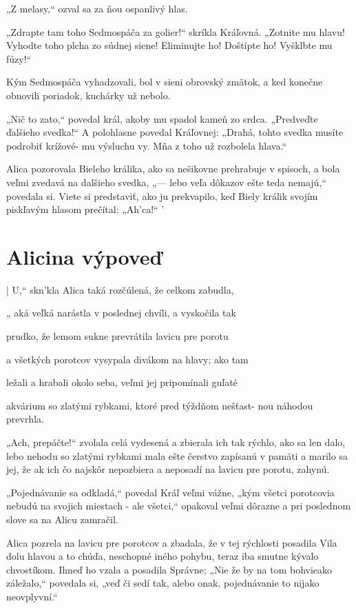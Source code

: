 \documentclass[12pt]{book}
\begin{document}
\begin{Parallel}[p]{}{}
{„Z melasy,“ ozval sa za ňou ospanlivý hlas.

„Zdrapte tam toho Sedmospáča za golier!“ skríkla
Kráľovná. „Zotnite mu hlavu! Vyhodte toho plcha zo
súdnej siene! Eliminujte ho! Doštípte ho! Vyšklbte mu
fúzy!“

Kým Sedmospáča vyhadzovali, bol v sieni obrovský
zmätok, a ked konečne obnovili poriadok, kuchárky už
nebolo.

„Nič to zato,“ povedal král, akoby mu spadol kameň zo
srdca. „Predveďte ďalšieho svedka!“ A polohlasne povedal
Kráľovnej: „Drahá, tohto svedka musíte podrobiť krížové-
mu výsluchu vy. Mňa z toho už rozbolela hlava.“

Alica pozorovala Bieleho králika, ako sa nešikovne
prehrabuje v spisoch, a bola veľmi zvedavá na dalšieho
svedka, „— lebo veľa dôkazov ešte teda nemajú,“ povedala
si. Viete si predstaviť, ako ju prekvapilo, keď Biely králik
svojím piskľavým hlasom prečítal: „Ah'ca!“ '

\section{Alicina výpoveď}

| U,“ skn'kla Alica taká rozčúlená, že celkom zabudla,

„ aká veľká narástla v poslednej chvíli, a vyskočila tak

prudko, že lemom sukne prevrátila lavicu pre porotu

a všetkých porotcov vysypala divákom na hlavy; ako tam

ležali a hrabali okolo seba, veľmi jej pripomínali guľaté

akvárium so zlatými rybkami, ktoré pred týždňom nešťast-
nou náhodou prevrhla.

„Ach, prepáčte!“ zvolala celá vydesená a zbierala ich tak
rýchlo, ako sa len dalo, lebo nehodu so zlatými rybkami mala
ešte čerstvo zapísanú v pamäti a marilo sa jej, že ak ich čo
najskôr nepozbiera a neposadí na lavicu pre porotu,
zahynú.

„Pojednávanie sa odkladá,“ povedal Kráľ veľmi vážne,
„kým všetci porotcovia nebudú na svojich miestach - ale
všetci,“ opakoval veľmi dôrazne a pri poslednom slove sa
na Alicu zamračil.

Alica pozrela na lavicu pre porotcov a zbadala, že v tej
rýchlosti posadila Vila dolu hlavou a to chúďa, neschopné
iného pohybu, teraz iba smutne kývalo chvostíkom. Ihneď
ho vzala a posadila Správne; „Nie že by na tom bohvieako
záležalo,“ povedala si, „veď či sedí tak, alebo onak,
pojednávanie to nijako neovplyvní.“

}
\end{Parallel}
\end{document}
